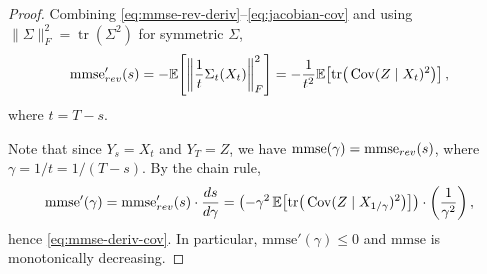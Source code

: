 \documentclass[10pt,a4paper]{amsart}
\begin{document}
\begin{proof}
Combining \eqref{eq:mmse-rev-deriv}--\eqref{eq:jacobian-cov} and using
$\|\Sigma\|_F^2=\operatorname{tr}(\Sigma^2)$ for symmetric $\Sigma$,
\[
\mathrm{mmse}_{\rm rev}'(s)
=-\mathbb E\!\left[\left\|\frac{1}{t}\Sigma_t(X_t)\right\|_F^2\right]
=-\frac{1}{t^2}\mathbb E\!\left[\operatorname{tr}\!\big(\operatorname{Cov}(Z\mid X_t)^2\big)\right],
\]
where $t=T-s$.



Note that since $Y_s=X_t$ and $Y_T=Z$, we have $\mathrm{mmse}(\gamma)=\mathrm{mmse}_{\rm rev}(s)$, where $\gamma=1/t=1/(T-s)$. By the chain rule,
\[
\mathrm{mmse}'(\gamma)=\mathrm{mmse}_{\rm rev}'(s)\cdot\frac{ds}{d\gamma}
= \left(-\gamma^2\,\mathbb E\!\left[\operatorname{tr}\!\big(\operatorname{Cov}(Z\mid X_{1/\gamma})^2\big)\right]\right)\cdot\left(\frac{1}{\gamma^2}\right),
\]
hence \eqref{eq:mmse-deriv-cov}. 
In particular, $\mathrm{mmse}'(\gamma)\le 0$ and
$\mathrm{mmse}$ is monotonically decreasing.
\end{proof}
\end{document}
